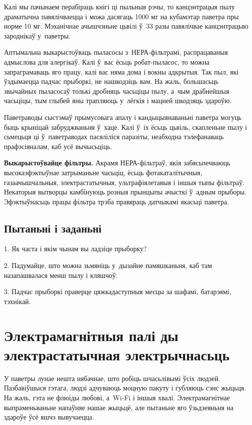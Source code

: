 Калі мы пачынаем перабіраць кнігі ці пыльныя рэчы, то канцэнтрацыя пылу драматычна павялічваецца і можа дасягаць 1000 мг на кубамэтар паветра пры норме 10 мг. Мэханічнае ачышчэньне цьвілі ў~33 разы павялічвае канцэнтрацыю зароднікаў у~паветры.


Аптымальна выкарыстоўваць пыласосы з~НЕРА-фільтрамі, распрацаваныя адмыслова для алергікаў. Калі ў~вас ёсьць робат-пыласос, то можна запраграмаваць яго працу, калі вас няма дома і вокны адкрытыя. Так пыл, які ўздымаецца падчас прыборкі, не нашкодзіць вам. На жаль, большасьць звычайных пыласосаў толькі дробняць часьціцы пылу, а~чым драбнейшыя часьціцы, тым глыбей яны трапляюць у~лёгкія і мацней шкодзяць здароўю.

Паветраводы сыстэмаў прымусовага апалу і кандыцыянаваньні паветра могуць быць крыніцай забруджваньня ў~хаце. Калі ў~іх ёсьць цьвіль, скапленьне пылу і сьмецьця ці ў~паветраводах пасяліліся паразіты, неабходна тэлефанаваць прафэсіяналам, каб усё вычысьціць.

\textbf{Выкарыстоўвайце фільтры.} Акрамя НЕРА-фільтраў, якія забясьпечваюць высокаэфэктыўнае затрыманьне часьціц, ёсьць фотакаталітычныя, газаачышчальныя, электрастатычныя, ультрафіялетавыя і іншыя тыпы фільтраў. Некаторыя вытворцы камбінуюць розныя прынцыпы ачысткі ў~адным прыборы. Эфэктыўнасьць працы фільтра трэба правяраць датчыкамі якасьці паветра.

\subsection*{Пытаньні і заданьні}

1. Як часта і якім чынам вы ладзіце прыборку?

2. Падумайце, што можна зьмяніць у~дызайне памяшканьня, каб там назапашвалася менш пылу і кляшчоў.

3. Падчас прыборкі праверце цяжкадаступныя месцы за шафамі, батарэямі, тэхнікай.


\section{Электрамагнітныя палі ды электрастатычная электрычнасьць}

У паветры лунае нешта нябачнае, што робіць шчасьлівымі ўсіх людзей. Пазбавіўшыся гэтага, людзі адчуваюць моцную пакуту і губляюць сэнс жыцьця. На жаль, гэта не флюіды любові, а~Wi-Fi і іншыя хвалі. Электрамагнітнае выпраменьваньне напаўняе нашае жыцьцё, але пытаньне яго ўзьдзеяньня на здароўе ўсё яшчэ вывучаецца.

